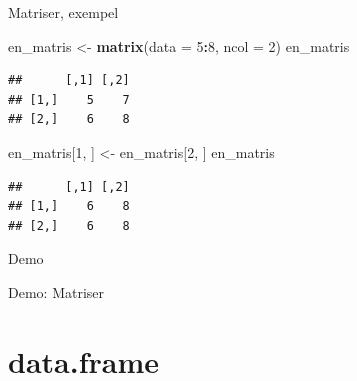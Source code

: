 \documentclass[
  11pt,
  ignorenonframetext,
]{beamer}
\newenvironment{Shaded}{\begin{snugshade}}{\end{snugshade}}
\newcommand{\AttributeTok}[1]{\textcolor[rgb]{0.13,0.29,0.53}{#1}}
\newcommand{\DecValTok}[1]{\textcolor[rgb]{0.00,0.00,0.81}{#1}}
\newcommand{\FunctionTok}[1]{\textcolor[rgb]{0.13,0.29,0.53}{\textbf{#1}}}
\newcommand{\NormalTok}[1]{#1}
\newcommand{\OtherTok}[1]{\textcolor[rgb]{0.56,0.35,0.01}{#1}}
\newcommand{\SpecialCharTok}[1]{\textcolor[rgb]{0.81,0.36,0.00}{\textbf{#1}}}
\begin{document}
\begin{frame}[fragile]{Matriser, exempel}
\label{matriser-exempel}
\begin{Shaded}
\begin{Highlighting}[]
\NormalTok{en\_matris }\OtherTok{\textless{}{-}} \FunctionTok{matrix}\NormalTok{(}\AttributeTok{data =} \DecValTok{5}\SpecialCharTok{:}\DecValTok{8}\NormalTok{, }\AttributeTok{ncol =} \DecValTok{2}\NormalTok{)}
\NormalTok{en\_matris}
\end{Highlighting}
\end{Shaded}

\begin{verbatim}
##      [,1] [,2]
## [1,]    5    7
## [2,]    6    8
\end{verbatim}

\pause

\begin{Shaded}
\begin{Highlighting}[]
\NormalTok{en\_matris[}\DecValTok{1}\NormalTok{, ] }\OtherTok{\textless{}{-}}\NormalTok{ en\_matris[}\DecValTok{2}\NormalTok{, ]}
\NormalTok{en\_matris}
\end{Highlighting}
\end{Shaded}

\begin{verbatim}
##      [,1] [,2]
## [1,]    6    8
## [2,]    6    8
\end{verbatim}
\end{frame}

\begin{frame}{Demo}
\label{demo}
\begin{block}{Demo: Matriser}
\label{demo-matriser}
\end{block}
\end{frame}

\section{data.frame}\label{data.frame}
\end{document}
